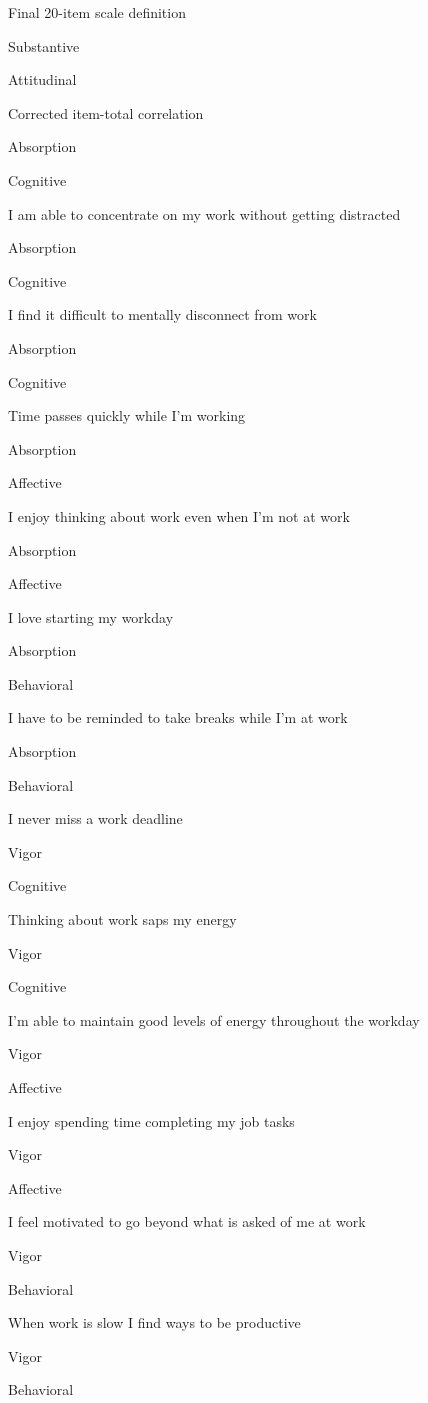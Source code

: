\documentclass[
]{article}
\begin{document}
Final 20-item scale definition

Substantive

Attitudinal

Corrected item-total correlation

Absorption

Cognitive

I am able to concentrate on my work without getting distracted

Absorption

Cognitive

I find it difficult to mentally disconnect from work

Absorption

Cognitive

Time passes quickly while I'm working

Absorption

Affective

I enjoy thinking about work even when I'm not at work

Absorption

Affective

I love starting my workday

Absorption

Behavioral

I have to be reminded to take breaks while I'm at work

Absorption

Behavioral

I never miss a work deadline

Vigor

Cognitive

Thinking about work saps my energy

Vigor

Cognitive

I'm able to maintain good levels of energy throughout the workday

Vigor

Affective

I enjoy spending time completing my job tasks

Vigor

Affective

I feel motivated to go beyond what is asked of me at work

Vigor

Behavioral

When work is slow I find ways to be productive

Vigor

Behavioral
\end{document}
